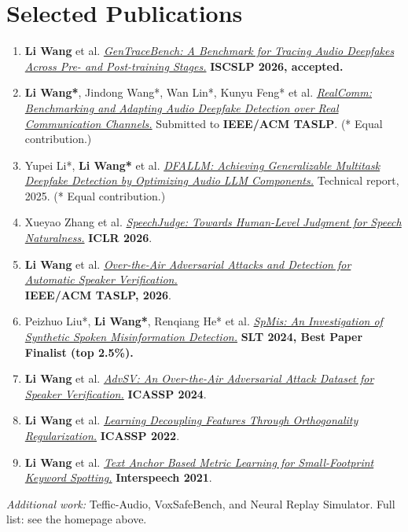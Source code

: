 \documentclass{resume}
\begin{document}
\section{Selected Publications}
\begin{enumerate}
  \item \textbf{Li Wang} et al. \href{https://arxiv.org/abs/2609.21738}{\textit{GenTraceBench: A Benchmark for Tracing Audio Deepfakes Across Pre- and Post-training Stages.}} \textbf{ISCSLP 2026, accepted.}
  \item \textbf{Li Wang*}, Jindong Wang*, Wan Lin*, Kunyu Feng* et al. \href{https://wwwwwli.github.io/RealComm/}{\textit{RealComm: Benchmarking and Adapting Audio Deepfake Detection over Real Communication Channels.}} Submitted to \textbf{IEEE/ACM TASLP}. (* Equal contribution.)
  \item Yupei Li*, \textbf{Li Wang*} et al. \href{https://arxiv.org/abs/2512.08403}{\textit{DFALLM: Achieving Generalizable Multitask Deepfake Detection by Optimizing Audio LLM Components.}} Technical report, 2025. (* Equal contribution.)
  \item Xueyao Zhang et al. \href{https://arxiv.org/abs/2511.07931}{\textit{SpeechJudge: Towards Human-Level Judgment for Speech Naturalness.}} \textbf{ICLR 2026}.
  \item \textbf{Li Wang} et al. \href{https://ieeexplore.ieee.org/document/11334038}{\textit{Over-the-Air Adversarial Attacks and Detection for Automatic Speaker Verification.}}\\ \textbf{IEEE/ACM TASLP, 2026}.
  \item Peizhuo Liu*, \textbf{Li Wang*}, Renqiang He* et al. \href{https://arxiv.org/abs/2409.11308}{\textit{SpMis: An Investigation of Synthetic Spoken Misinformation Detection.}} \textbf{SLT 2024, Best Paper Finalist (top 2.5\%).}
  \item \textbf{Li Wang} et al. \href{https://arxiv.org/abs/2310.05369}{\textit{AdvSV: An Over-the-Air Adversarial Attack Dataset for Speaker Verification.}} \textbf{ICASSP 2024}.
  \item \textbf{Li Wang} et al. \href{https://ieeexplore.ieee.org/document/9747878}{\textit{Learning Decoupling Features Through Orthogonality Regularization.}} \textbf{ICASSP 2022}.
  \item \textbf{Li Wang} et al. \href{https://www.isca-speech.org/archive/interspeech_2021/wang21da_interspeech.html}{\textit{Text Anchor Based Metric Learning for Small-Footprint Keyword Spotting.}} \textbf{Interspeech 2021}.
\end{enumerate}
\textit{Additional work:} Teffic-Audio, VoxSafeBench, and Neural Replay Simulator. Full list: see the homepage above.
\end{document}
